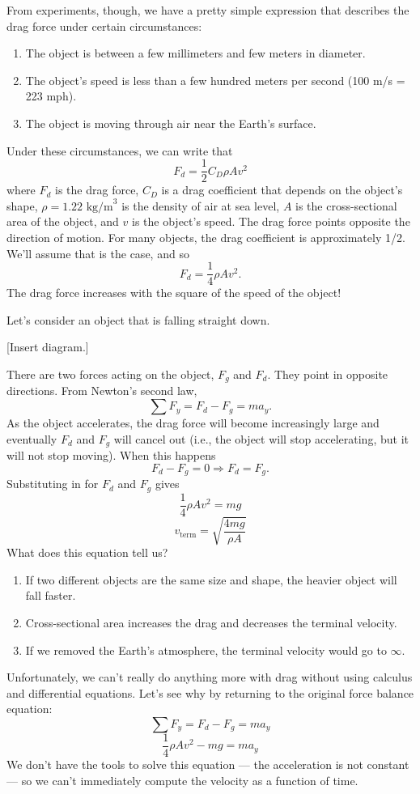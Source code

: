 From experiments, though, we have a pretty simple expression that describes the drag force under certain circumstances:
\begin{enumerate}
\item The object is between a few millimeters and few meters in diameter.
\item The object's speed is less than a few hundred meters per second (100 m/s = 223 mph).
\item The object is moving through air near the Earth's surface.
\end{enumerate}
Under these circumstances, we can write that
$$\boxed{F_d=\frac{1}{2}C_D\rho Av^2}$$
where $F_d$ is the drag force, $C_D$ is a drag coefficient that depends on the object's shape, $\rho=1.22\mbox{ kg/m}^3$ is the density of air at sea level, $A$ is the cross-sectional area of the object, and $v$ is the object's speed. The drag force points opposite the direction of motion. For many objects, the drag coefficient is approximately 1/2. We'll assume that is the case, and so
$$\boxed{F_d=\frac{1}{4}\rho Av^2}.$$
The drag force increases with the square of the speed of the object!

Let's consider an object that is falling straight down.

[Insert diagram.]
\vspace{5cm}

There are two forces acting on the object, $F_g$ and $F_d$. They point in opposite directions. From Newton's second law,
$$\sum F_y=F_d-F_g=ma_y.$$
As the object accelerates, the drag force will become increasingly large and eventually $F_d$ and $F_g$ will cancel out (i.e., the object will stop accelerating, but it will not stop moving). When this happens
$$F_d-F_g=0\Rightarrow F_d=F_g.$$
Substituting in for $F_d$ and $F_g$ gives
$$\frac{1}{4}\rho Av^2=mg$$
$$\boxed{v_{\mbox{term}}=\sqrt{\frac{4mg}{\rho A}}}$$
What does this equation tell us?
\begin{enumerate}
\item If two different objects are the same size and shape, the heavier object will fall faster.
\item Cross-sectional area increases the drag and decreases the terminal velocity.
\item If we removed the Earth's atmosphere, the terminal velocity would go to $\infty$.
\end{enumerate}

Unfortunately, we can't really do anything more with drag without using calculus and differential equations. Let's see why by returning to the original force balance equation:
$$\sum F_y=F_d-F_g=ma_y$$
$$\frac{1}{4}\rho Av^2-mg=ma_y$$
We don't have the tools to solve this equation --- the acceleration is not constant --- so we can't immediately compute the velocity as a function of time.


